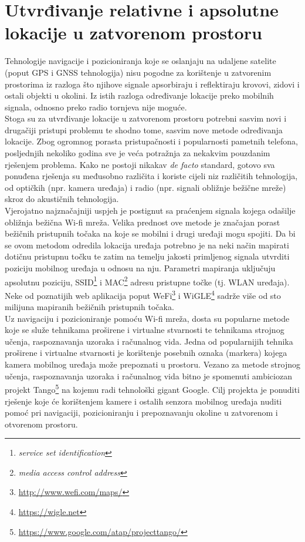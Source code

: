 \chapter{Utvrđivanje relativne i apsolutne lokacije u zatvorenom prostoru}

Tehnologije navigacije i pozicioniranja koje se oslanjaju na udaljene satelite (poput GPS i GNSS tehnologija) nisu pogodne za korištenje u zatvorenim prostorima iz razloga što njihove signale apsorbiraju i reflektiraju krovovi, zidovi i ostali objekti u okolini. 
Iz istih razloga određivanje lokacije preko mobilnih signala, odnosno preko radio tornjeva nije moguće. 
\\
Stoga su za utvrđivanje lokacije u zatvorenom prostoru potrebni sasvim novi i drugačiji pristupi problemu te shodno tome, sasvim nove metode određivanja lokacije. 
Zbog ogromnog porasta pristupačnosti i popularnosti pametnih telefona, posljednjih nekoliko godina sve je veća potražnja za nekakvim pouzdanim rješenjem problema. 
Kako ne postoji nikakav \textit{de facto} standard, gotovo sva ponuđena rješenja su međusobno različita i koriste cijeli niz različitih tehnologija, od optičkih (npr. kamera uređaja) i radio (npr. signali obližnje bežične mreže) skroz do akustičnih tehnologija.
\\

Vjerojatno najznačajniji uspjeh je postignut sa praćenjem signala kojega odašilje obližnja bežična Wi-fi mreža. 
Velika prednost ove metode je značajan porast bežičnih pristupnih točaka na koje se mobilni i drugi uređaji mogu spojiti. 
Da bi se ovom metodom odredila lokacija uređaja potrebno je na neki način mapirati dotičnu pristupnu točku te zatim na temelju jakosti primljenog signala utvrditi poziciju mobilnog uređaja u odnosu na nju. 
Parametri mapiranja uključuju apsolutnu poziciju, SSID\footnote{\textit{service set identification}} i MAC\footnote{\textit{media access control address}} adresu pristupne točke (tj. WLAN uređaja). 
Neke od poznatijih web aplikacija poput WeFi\footnote{\url{http://www.wefi.com/maps/}} i WiGLE\footnote{\url{https://wigle.net}} sadrže više od sto milijuna mapiranih bežičnih pristupnih točaka. 
\\

Uz navigaciju i pozicioniranje pomoću Wi-fi mreža, dosta su popularne metode koje se služe tehnikama proširene i virtualne stvarnosti te tehnikama strojnog učenja, raspoznavanja uzoraka i računalnog vida. 
Jedna od popularnijih tehnika proširene i virtualne stvarnosti je korištenje posebnih oznaka (markera) kojega kamera mobilnog uređaja može prepoznati u prostoru. 
Vezano za metode strojnog učenja, raspoznavanja uzoraka i računalnog vida bitno je spomenuti ambiciozan projekt Tango\footnote{\url{https://www.google.com/atap/projecttango/}} na kojemu radi tehnološki gigant Google. 
Cilj projekta je ponuditi rješenje koje će korištenjem kamere i ostalih senzora mobilnog uređaja nuditi pomoć pri navigaciji, pozicioniranju i prepoznavanju okoline u zatvorenom i otvorenom prostoru.

